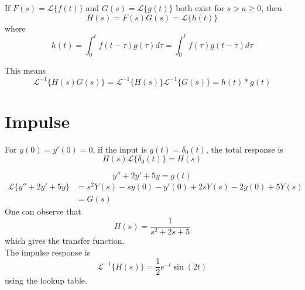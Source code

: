 \documentclass[12pt]{article}
\begin{document}
\begin{thm}
	If $F(s)=\mathcal{L}\{f(t)\}$ and $G(s)=\mathcal{L}\{g(t)\}$ both exist for $s>a\geq0$, then
	$$H(s) = F(s)G(s) = \mathcal{L}\{h(t)\}$$
	where
	$$h(t) = \int_0^t f(t-\tau)g(\tau)d\tau = \int_0^t f(\tau)g(t-\tau)d\tau$$
\end{thm}

This means
$$\mathcal{L}^{-1}\{H(s)G(s)\} = \mathcal{L}^{-1}\{H(s)\}\mathcal{L}^{-1}\{G(s)\} = h(t)*g(t)$$

\section{Impulse}
For $y(0) = y'(0) = 0$, if the input is $g(t) = \delta_0(t)$, the total response is
$$H(s)\mathcal{L}\{\delta_0(t)\} = H(s)$$

\begin{ex}
	$$y'' + 2y' + 5y = g(t)$$
	\begin{align*}
		\mathcal{L}\{y'' + 2y' + 5y\} &= s^2Y(s) - sy(0) - y'(0) + 2sY(s) - 2y(0) + 5Y(s) \\
					      &= G(s)
	\end{align*}
	One can observe that
	$$H(s) = \frac{1}{s^2 + 2s + 5}$$
	which gives the transfer function. \\
	The impulse response is
	$$\mathcal{L}^{-1}\{H(s)\} = \frac{1}{2}e^{-t}\sin(2t)$$
	using the lookup table.
\end{ex}
\end{document}
